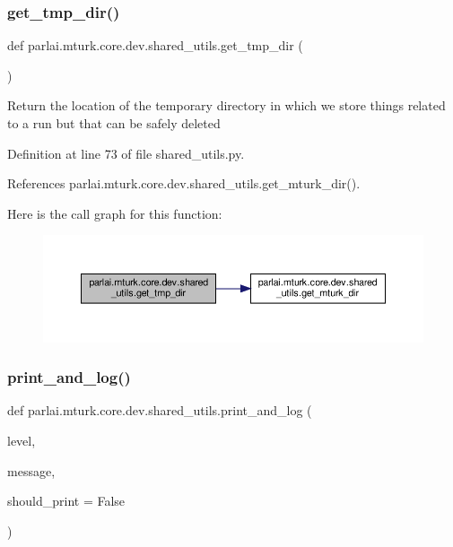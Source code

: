 \subsubsection{\texorpdfstring{get\+\_\+tmp\+\_\+dir()}{get\_tmp\_dir()}}
{\footnotesize\ttfamily def parlai.\+mturk.\+core.\+dev.\+shared\+\_\+utils.\+get\+\_\+tmp\+\_\+dir (\begin{DoxyParamCaption}{ }\end{DoxyParamCaption})}

\begin{DoxyVerb}Return the location of the temporary directory in which we store
things related to a run but that can be safely deleted
\end{DoxyVerb}
 

Definition at line 73 of file shared\+\_\+utils.\+py.



References parlai.\+mturk.\+core.\+dev.\+shared\+\_\+utils.\+get\+\_\+mturk\+\_\+dir().

Here is the call graph for this function\+:
\nopagebreak
\begin{figure}[H]
\begin{center}
\leavevmode
\includegraphics[width=350pt]{namespaceparlai_1_1mturk_1_1core_1_1dev_1_1shared__utils_a3bb51eaf0110918e082cae3ffd14d4d0_cgraph}
\end{center}
\end{figure}
\mbox{\label{namespaceparlai_1_1mturk_1_1core_1_1dev_1_1shared__utils_aaf34fac6f7340bd67e9cb62283bc3a28}} 
\subsubsection{\texorpdfstring{print\+\_\+and\+\_\+log()}{print\_and\_log()}}
{\footnotesize\ttfamily def parlai.\+mturk.\+core.\+dev.\+shared\+\_\+utils.\+print\+\_\+and\+\_\+log (\begin{DoxyParamCaption}\item[{}]{level,  }\item[{}]{message,  }\item[{}]{should\+\_\+print = {\ttfamily False} }\end{DoxyParamCaption})}



